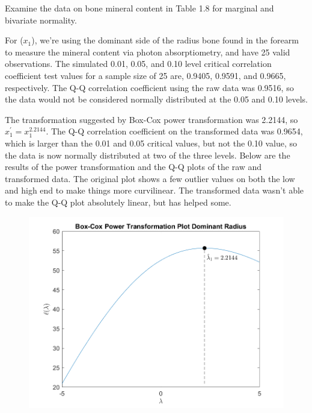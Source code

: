 Examine the data on bone mineral content in Table 1.8 for marginal and bivariate normality.

For ($x_{1}$), we're using the dominant side of the radius bone found in the forearm to measure the mineral content via photon absorptiometry, and have 25 valid observations. The simulated 0.01, 0.05, and 0.10 level critical correlation coefficient test values for a sample size of 25 are, 0.9405, 0.9591, and 0.9665, respectively. The Q-Q correlation coefficient using the raw data was 0.9516, so the data would not be considered normally distributed at the 0.05 and 0.10 levels.

The transformation suggested by Box-Cox power transformation was 2.2144, so $x_{1}^{\prime} = x_{1}^{2.2144}$. The Q-Q correlation coefficient on the transformed data was 0.9654, which is larger than the 0.01 and 0.05 critical values, but not the 0.10 value, so the data is now normally distributed at two of the three levels. Below are the results of the power transformation and the Q-Q plots of the raw and transformed data. The original plot shows a few outlier values on both the low and high end to make things more curvilinear. The transformed data wasn't able to make the Q-Q plot absolutely linear, but has helped some.

\begin{center}
    \begin{figure}[H]
        \centering
        \includegraphics[scale=0.6]{./matlab/chapter-4/sol4.34.power.1.png}
    \end{figure}
\end{center}

